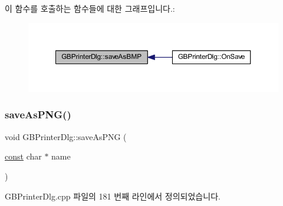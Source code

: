 이 함수를 호출하는 함수들에 대한 그래프입니다.\+:
\nopagebreak
\begin{figure}[H]
\begin{center}
\leavevmode
\includegraphics[width=350pt]{class_g_b_printer_dlg_a49404740bed8928cf83d77acb9dcaf83_icgraph}
\end{center}
\end{figure}
\mbox{\label{class_g_b_printer_dlg_ad776132a614d5e3bec1567f38d9c5d9c}} 
\subsubsection{\texorpdfstring{save\+As\+P\+N\+G()}{saveAsPNG()}}
{\footnotesize\ttfamily void G\+B\+Printer\+Dlg\+::save\+As\+P\+NG (\begin{DoxyParamCaption}\item[{\mbox{\hyperlink{getopt1_8c_a2c212835823e3c54a8ab6d95c652660e}{const}} char $\ast$}]{name }\end{DoxyParamCaption})}



G\+B\+Printer\+Dlg.\+cpp 파일의 181 번째 라인에서 정의되었습니다.



